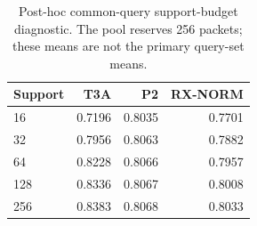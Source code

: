 \begin{table}[t]
\centering
\caption{Post-hoc common-query support-budget diagnostic. The pool reserves 256 packets; these means are not the primary query-set means.}
\label{tab:budget}
\small
\begin{tabular}{lrrr}
\toprule
Support & T3A & P2 & RX-NORM\\
\midrule
16 & 0.7196 & 0.8035 & 0.7701\\
32 & 0.7956 & 0.8063 & 0.7882\\
64 & 0.8228 & 0.8066 & 0.7957\\
128 & 0.8336 & 0.8067 & 0.8008\\
256 & 0.8383 & 0.8068 & 0.8033\\
\bottomrule
\end{tabular}
\end{table}
